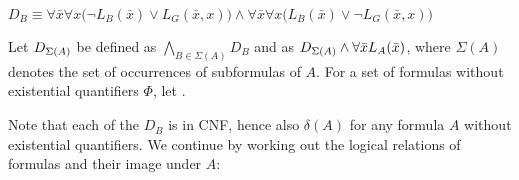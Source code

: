 \begin{defi}
\begin{itemize}
			$D_B\equiv \forall \bar x \forall x \big(\lnot L_B(\bar x) \lor L_G(\bar x, x)\big) \land \forall \bar x \forall x \big(L_B(\bar x) \lor \lnot L_G(\bar x, x)\big)$
	\end{itemize}

	Let $D_{\Sigma(A)}$ be defined as $\bigwedge_{B \in \Sigma(A)} D_B$ and
	 as $D_{\Sigma(A)} \land \forall \bar x L_A(\bar x)$, where $\Sigma(A)$ denotes the set of occurrences of subformulas of $A$.
	For a set of formulas without existential quantifiers $\Phi$, let .
\end{defi}

Note that each of the $D_B$ is in CNF, hence also $\delta(A)$ for any formula $A$ without existential quantifiers.
We continue by working out the logical relations of formulas and their image under $A$:

